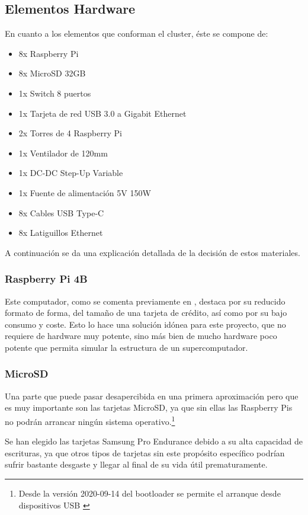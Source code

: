 \subsection{Elementos Hardware}
En cuanto a los elementos que conforman el cluster, éste se compone de:
\begin{itemize}
    \item 8x Raspberry Pi
    \item 8x MicroSD 32GB
    \item 1x Switch 8 puertos
    \item 1x Tarjeta de red USB 3.0 a Gigabit Ethernet 
    \item 2x Torres de 4 Raspberry Pi
    \item 1x Ventilador de 120mm
    \item 1x DC-DC Step-Up Variable 
    \item 1x Fuente de alimentación 5V 150W
    \item 8x Cables USB Type-C
    \item 8x Latiguillos Ethernet
\end{itemize}

A continuación se da una explicación detallada de la decisión de estos materiales.

\subsubsection{Raspberry Pi 4B}
Este computador, como se comenta previamente en , destaca por su reducido formato de forma, del tamaño de una tarjeta de crédito, así como por su bajo consumo y coste. Esto lo hace una solución idónea para este proyecto, que no requiere de hardware muy potente, sino más bien de mucho hardware poco potente que permita simular la estructura de un supercomputador.


\subsubsection{MicroSD}
Una parte que puede pasar desapercibida en una primera aproximación pero que es muy importante son las tarjetas MicroSD, ya que sin ellas las Raspberry Pis no podrán arrancar ningún sistema operativo.\footnote{Desde la versión 2020-09-14 del bootloader se permite el arranque desde dispositivos USB \cite{rpibootloader20200903}}

Se han elegido las tarjetas Samsung Pro Endurance debido a su alta capacidad de escrituras, ya que otros tipos de tarjetas sin este propósito específico podrían sufrir bastante desgaste y llegar al final de su vida útil prematuramente. 

